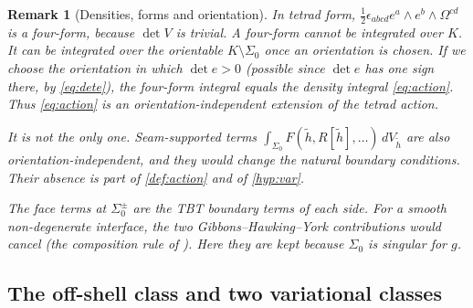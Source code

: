 \documentclass[11pt]{article}
\theoremstyle{canonmath}
\newtheorem{remark}[theorem]{Remark}
\theoremstyle{canonpostulate}
\theoremstyle{canonproposition}
\theoremstyle{canonmath}
\theoremstyle{canonproposition}
\providecommand{\Vb}{\mathcal{V}}
\providecommand{\Klein}{\mathcal{K}}
\def\mathcal#1{#1}%
\begin{document}
\begin{remark}[Densities, forms and orientation]\label{rem:density}
In tetrad form, $\tfrac12\epsilon_{abcd}e^a\wedge e^b\wedge\Omega^{cd}$ is a four-form, because $\det\Vb$ is trivial. A four-form cannot be integrated over $\Klein$. It can be integrated over the orientable $\Klein\setminus\Sigma_0$ once an orientation is chosen. If we choose the orientation in which $\det e>0$ (possible since $\det e$ has one sign there, by \eqref{eq:dete}), the four-form integral equals the density integral \eqref{eq:action}. Thus \eqref{eq:action} is an orientation-independent extension of the tetrad action.

It is not the only one. Seam-supported terms $\int_{\Sigma_0}F(\tilde h,R[\tilde h],\dots)\,dV_{\tilde h}$ are also orientation-independent, and they would change the natural boundary conditions. Their absence is part of \cref{def:action} and of \ref{hyp:var}.

The face terms at $\Sigma_0^\pm$ are the TBT boundary terms of each side. For a smooth non-degenerate interface, the two Gibbons--Hawking--York contributions would cancel (the composition rule of \cite{TBT2026}). Here they are kept because $\Sigma_0$ is singular for $g$.
\end{remark}

\subsection{The off-shell class and two variational classes}
\end{document}
